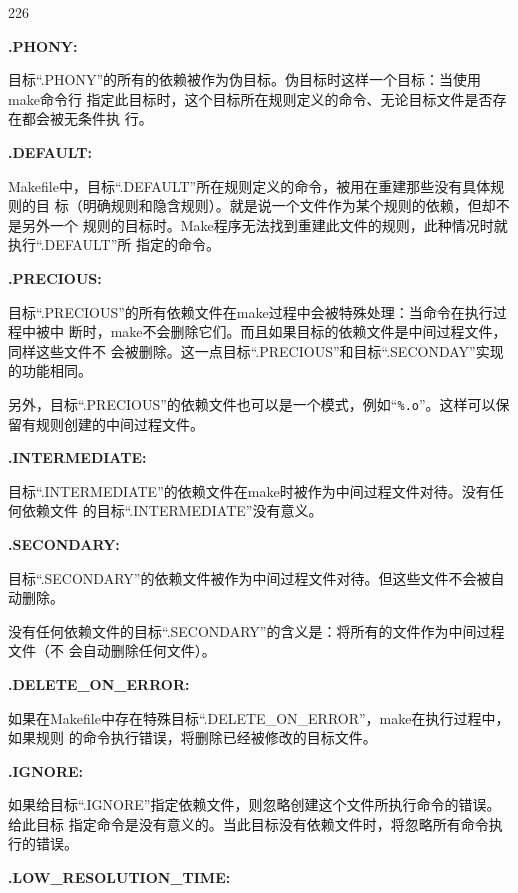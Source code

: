 \begin{dinglist}{226}
\itemsep=4pt \parskip=0pt

\item \textbf{.PHONY:}

目标“.PHONY”的所有的依赖被作为伪目标。伪目标时这样一个目标：当使用make命令行
指定此目标时，这个目标所在规则定义的命令、无论目标文件是否存在都会被无条件执
行。

\item \textbf{.DEFAULT:}

Makefile中，目标“.DEFAULT”所在规则定义的命令，被用在重建那些没有具体规则的目
标（明确规则和隐含规则）。就是说一个文件作为某个规则的依赖，但却不是另外一个
规则的目标时。Make程序无法找到重建此文件的规则，此种情况时就执行“.DEFAULT”所
指定的命令。


\item \textbf{.PRECIOUS:}

目标“.PRECIOUS”的所有依赖文件在make过程中会被特殊处理：当命令在执行过程中被中
断时，make不会删除它们。而且如果目标的依赖文件是中间过程文件，同样这些文件不
会被删除。这一点目标“.PRECIOUS”和目标“.SECONDAY”实现的功能相同。

另外，目标“.PRECIOUS”的依赖文件也可以是一个模式，例如“\verb"%.o"”。这样可以保
留有规则创建的中间过程文件。

\item \textbf{.INTERMEDIATE:}

目标“.INTERMEDIATE”的依赖文件在make时被作为中间过程文件对待。没有任何依赖文件
的目标“.INTERMEDIATE”没有意义。

\item \textbf{.SECONDARY:}

目标“.SECONDARY”的依赖文件被作为中间过程文件对待。但这些文件不会被自动删除。

没有任何依赖文件的目标“.SECONDARY”的含义是：将所有的文件作为中间过程文件（不
会自动删除任何文件）。

\item \textbf{.DELETE\_ON\_ERROR:}

如果在Makefile中存在特殊目标“.DELETE\_ON\_ERROR”，make在执行过程中，如果规则
的命令执行错误，将删除已经被修改的目标文件。

\item \textbf{.IGNORE:}

如果给目标“.IGNORE”指定依赖文件，则忽略创建这个文件所执行命令的错误。给此目标
指定命令是没有意义的。当此目标没有依赖文件时，将忽略所有命令执行的错误。

\item \textbf{.LOW\_RESOLUTION\_TIME:}


\end{dinglist}
